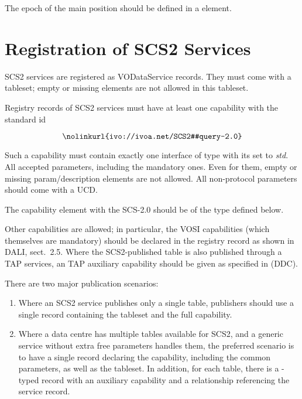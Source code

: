 \documentclass[11pt,a4paper]{ivoa}
\begin{document}
The epoch of the main position should be defined in a  element.


\section{Registration of SCS2 Services}

SCS2 services are registered as VODataService
\citep{2021ivoa.spec.1102D}  records.  They must come
with a tableset; empty or missing  elements are
not allowed in this tableset.

Registry records of SCS2 services must have at least one capability with
the standard id

$$
\hbox{\nolinkurl{ivo://ivoa.net/SCS2#query-2.0}}
$$

Such a capability must contain exactly one interface of type
 with its  set to \emph{std}.  All
accepted parameters, including the mandatory ones.  Even for them, empty
or missing param/description elements are not allowed.  All non-protocol
parameters should come with a UCD.

The capability element with the SCS-2.0  should be of
the type  defined below.

Other capabilities are allowed; in particular, the VOSI capabilities
(which themselves are mandatory) should be declared in the registry
record as shown in DALI, sect.~2.5.  Where the SCS2-published table is
also published through a TAP services, an TAP auxiliary capability
should be given as specified in \citet{2019ivoa.spec.0520D} (DDC).

There are two major publication scenarios:

\begin{enumerate}
\item Where an SCS2 service publishes only a single table, publishers
should use a single  record containing the
tableset and the full capability.

\item Where a data centre has multiple tables available for SCS2, and a
generic service without extra free parameters handles them, the
preferred scenario is to have a single  record
declaring the capability, including the common parameters, as well as
the tableset.  In addition, for each table, there is a
-typed record with an auxiliary capability and
a relationship referencing the service record.

\end{enumerate}
\end{document}
